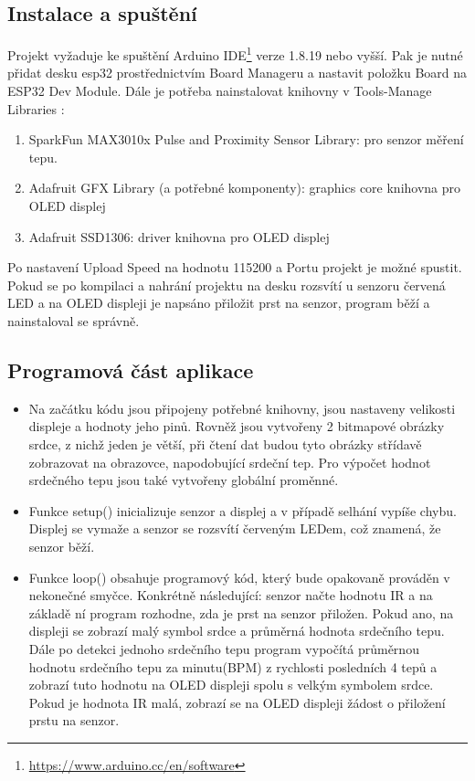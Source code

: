 \documentclass[a4paper, 12pt,h]{article}
\begin{document}
\subsection{Instalace a spuštění}
Projekt vyžaduje ke spuštění Arduino IDE\footnote{\href{
https://www.arduino.cc/en/software}{
https://www.arduino.cc/en/software}} verze 1.8.19 nebo vyšší. Pak je nutné přidat desku esp32 prostřednictvím Board Manageru a nastavit položku Board na ESP32 Dev Module. Dále je potřeba nainstalovat knihovny v Tools-Manage Libraries :
\begin{enumerate}
    \item SparkFun MAX3010x Pulse and Proximity Sensor Library: pro senzor měření tepu.
    \item Adafruit GFX Library (a potřebné komponenty): graphics core knihovna pro OLED displej
    \item Adafruit SSD1306: driver knihovna pro OLED displej
\end{enumerate}
Po nastavení Upload Speed na hodnotu 115200 a Portu projekt je možné spustit. Pokud se po kompilaci a nahrání projektu na desku rozsvítí u senzoru červená LED a na OLED displeji je napsáno přiložit prst na senzor, program běží a nainstaloval se správně.

\subsection{Programová část aplikace}
\begin{itemize}
    \item Na začátku kódu jsou připojeny potřebné knihovny, jsou nastaveny velikosti displeje a hodnoty jeho pinů. Rovněž jsou vytvořeny 2 bitmapové obrázky srdce, z nichž jeden je větší, při čtení dat budou tyto obrázky střídavě zobrazovat na obrazovce, napodobující srdeční tep. Pro výpočet hodnot srdečného tepu jsou také vytvořeny globální proměnné.
    \item Funkce setup() inicializuje senzor a displej a v případě selhání vypíše chybu. Displej se vymaže a senzor se rozsvítí červeným LEDem, což znamená, že senzor běží.
    \item Funkce loop() obsahuje programový kód, který bude opakovaně prováděn v nekonečné smyčce. Konkrétně následující: senzor načte hodnotu IR a na základě ní program rozhodne, zda je prst na senzor přiložen. Pokud ano, na displeji se zobrazí malý symbol srdce a průměrná hodnota srdečního tepu. Dále po detekci jednoho srdečního tepu program vypočítá průměrnou hodnotu srdečního tepu za minutu(BPM) z rychlosti posledních 4 tepů a zobrazí tuto hodnotu na OLED displeji spolu s velkým symbolem srdce. Pokud je hodnota IR malá, zobrazí se na OLED displeji žádost o přiložení prstu na senzor.
\end{itemize}
\end{document}
